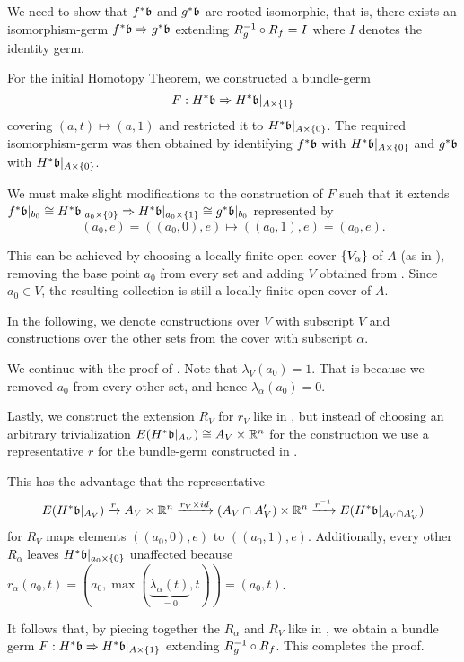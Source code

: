 \begin{myproof} We need to show that $\ind{f}\bb$ and $\ind{g}\bb$ are rooted isomorphic, that is, there exists an isomorphism-germ $\germ{\ind{f}\bb}{\ind{g}\bb}$ extending $R_g^{-1} \circ R_f = I$ where $I$ denotes the identity germ.

For the initial Homotopy Theorem, we constructed a bundle-germ \[ \germdef{F}{\ind{H}\bb}{\ind{H}\bb[\cylup{A}]} \] covering $(a, t) \mapsto (a, 1)$ and restricted it to $\ind{H}\bb[\cyldown{A}]$. The required isomorphism-germ was then obtained by identifying $\ind{f}\bb$ with $\ind{H}\bb[\cyldown{A}]$ and $\ind{g}\bb$ with $\ind{H}\bb[\cyldown{A}]$.

We must make slight modifications to the construction of $F$ such that it extends $\germ{\ind{f}\bbb \cong \ind{H}\bb[\cyldown{a_0}]}{\ind{H}\bb[\cylup{a_0}] \cong \ind{g}\bbb}$ represented by \[ (a_0, e) = ((a_0, 0), e) \mapsto ((a_0, 1), e) = (a_0, e). \]

This can be achieved by choosing a locally finite open cover $\{V_\alpha\}$ of $A$ (as in ), removing the base point $a_0$ from every set and adding $V$ obtained from . Since $a_0 \in V$, the resulting collection is still a locally finite open cover of $A$.

In the following, we denote constructions over $V$ with subscript $V$ and constructions over the other sets from the cover with subscript $\alpha$.

We continue with the proof of . Note that $\lambda_V(a_0) = 1$. That is because we removed $a_0$ from every other set, and hence $\lambda_\alpha(a_0) = 0$.

Lastly, we construct the extension $R_V$ for $r_V$ like in , but instead of choosing an arbitrary trivialization $E(\ind{H}\bb\restr{A_V}) \cong A_V \cross \R^n$ for the construction we use a representative $r$ for the bundle-germ constructed in .

This has the advantage that the representative \[ E(\ind{H}\bb[A_V]) \xto{r} A_V \cross \R^n \xto{r_V \cross id} (A_V \cap A'_V) \cross \R^n \xto{\inv{r}} E(\ind{H}\bb[A_V \cap A'_V]) \] for $R_V$ maps elements $((a_0, 0), e)$ to $((a_0, 1), e)$. Additionally, every other $R_\alpha$ leaves $\ind{H}\bb[\cyldown{a_0}]$ unaffected because $r_\alpha(a_0, t) = (a_0, \max(\underbrace{\lambda_\alpha(t)}_{= 0}, t)) = (a_0, t)$.

It follows that, by piecing together the $R_\alpha$ and $R_V$ like in , we obtain a bundle germ $\germdef{F}{\ind{H}\bb}{\ind{H}\bb[\cylup{A}]}$ extending $R_g^{-1} \circ R_f$. This completes the proof. \end{myproof}